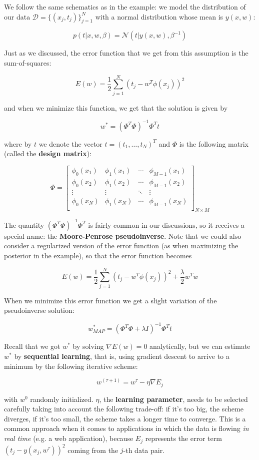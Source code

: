 We follow the same schematics as in the example: we model the distribution of our data $\mathcal{D} = \{(x_j, t_j)\}_{j=1}^N$ with a normal distribution whose mean is $y(x,w)$:

\[p(t|x,w,\beta) = \mathcal{N}(t|y(x,w),\beta^{-1})\]

Just as we discussed, the error function that we get from this assumption is the sum-of-squares:

\[E(w) = \frac{1}{2}\sum_{j=1}^N(t_j - w^T\phi(x_j))^2\]

and when we minimize this function, we get that the solution is given by

\[w^* =  (\Phi^T\Phi)^{-1}\Phi^Tt\]

where by $t$ we denote the vector $t = (t_1,\dots, t_N)^T$ and $\Phi$ is the following matrix (called the \textbf{design matrix}):

\[\Phi = \begin{bmatrix}
	\phi_0(x_1)&\phi_1(x_1)&\cdots&\phi_{M-1}(x_1)\\
	\phi_0(x_2)&\phi_1(x_2)&\cdots&\phi_{M-1}(x_2)\\
	\vdots&\vdots&\ddots&\vdots\\
	\phi_0(x_N)&\phi_1(x_N)&\cdots&\phi_{M-1}(x_N)\\
\end{bmatrix}_{N\times M}\]

The quantity $(\Phi^T\Phi)^{-1}\Phi^T$ is fairly common in our discussions, so it receives a special name: the \textbf{Moore-Penrose pseudoinverse}. Note that we could also consider a regularized version of the error function (as when maximizing the posterior in the example), so that the error function becomes

\[E(w) = \frac{1}{2}\sum_{j=1}^N(t_j - w^T\phi(x_j))^2 + \frac{\lambda}{2}w^Tw\]

When we minimize this error function we get a slight variation of the pseudoinverse solution:

\[w^*_{MAP} = (\Phi^T\Phi + \lambda I)^{-1}\Phi^Tt\]

Recall that we got $w^*$ by solving $\nabla E(w) = 0$ analytically, but we can estimate $w^*$ by \textbf{sequential learning}, that is, using gradient descent to arrive to a minimum by the following iterative scheme:

\[w^{(\tau+1)} = w^\tau - \eta\nabla E_j\]

with $w^0$ randomly initialized. $\eta$, the \textbf{learning parameter}, needs to be selected carefully taking into account the following trade-off: if it's too big, the scheme diverges, if it's too small, the scheme takes a longer time to converge. This is a common approach when it comes to applications in which the data is flowing \textit{in real time} (e.g. a web application), because $E_j$ represents the error term $(t_j - y(x_j, w^{\tau}))^2$ coming from the $j$-th data pair.

